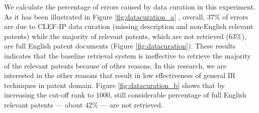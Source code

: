 We calculate the percentage of errors caused by data curation in this experiment. As it has been illustrated in Figure \ref{fig:datacuration_a}
, overall, $37\%$ of errors are due to CLEF-IP data curation (missing description and non-English relevant patents) while the majority of relevant patents, which are not retrieved ($63\%$), are full English patent documents (Figure \ref{fig:datacuration}). These results indicates that the baseline retrieval system is ineffective to retrieve the majority of the relevant patents because of other reasons. In this research, we are interested in the other reasons that result in low effectiveness of general IR techniques in patent domain. Figure \ref{fig:datacuration_b} shows that by increasing the cut-off rank to $1000$, still considerable percentage of full English relevant patents --- about $42\%$ --- are not retrieved.








